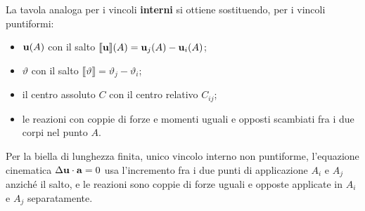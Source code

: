 \begin{table}[H]
	\centering
	\caption[Tavola riepilogativa dei vincoli piani esterni]{%
		Prestazioni cinematiche e statiche dei vincoli piani
		esterni: molteplicità, equazioni cinematiche, centro
		di rotazione assoluto e reazioni vincolari.}
	\label{tab:vincoli_esterni}
\end{table}


\medskip

\noindent
\medskip

\noindent
La tavola analoga per i vincoli \textbf{interni} si ottiene
sostituendo, per i vincoli puntiformi:
\begin{itemize}[noitemsep]
	\item $\mathbf{u}(A)$ con il salto
	$\llbracket \mathbf{u} \rrbracket(A) = \mathbf{u}_j(A) - \mathbf{u}_i(A)$;
	\item $\vartheta$ con il salto
	$\llbracket \vartheta \rrbracket = \vartheta_j - \vartheta_i$;
	\item il centro assoluto $C$ con il centro relativo
	$C_{ij}$;
	\item le reazioni con coppie di forze e momenti uguali
	e opposti scambiati fra i due corpi nel punto $A$.
\end{itemize}
Per la biella di lunghezza finita, unico vincolo interno
non puntiforme, l'equazione cinematica
$\Delta\mathbf{u} \cdot \mathbf{a} = 0$ usa l'incremento fra i due punti
di applicazione $A_i$ e $A_j$ anziché il salto, e le
reazioni sono coppie di forze uguali e opposte applicate
in $A_i$ e $A_j$ separatamente.


